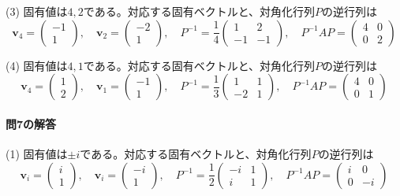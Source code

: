(3) 固有値は$4, 2$である。対応する固有ベクトルと、対角化行列$P$の逆行列は
\[
\bm{v}_4 = 
\begin{pmatrix}
-1 \\
1
\end{pmatrix}, \quad
\bm{v}_2 = 
\begin{pmatrix}
-2 \\
1
\end{pmatrix}, \quad
P^{-1} = 
\frac{1}{4}
\begin{pmatrix}
1 & 2 \\
-1 & -1
\end{pmatrix}, \quad
P^{-1} AP =
\begin{pmatrix}
4 & 0 \\
0 & 2
\end{pmatrix}
\]

(4) 固有値は$4, 1$である。対応する固有ベクトルと、対角化行列$P$の逆行列は
\[
\bm{v}_4 = 
\begin{pmatrix}
1 \\
2
\end{pmatrix}, \quad
\bm{v}_1 = 
\begin{pmatrix}
-1 \\
1
\end{pmatrix}, \quad
P^{-1} = 
\frac{1}{3}
\begin{pmatrix}
1 & 1 \\
-2 & 1
\end{pmatrix}, \quad
P^{-1} AP =
\begin{pmatrix}
4 & 0 \\
0 & 1
\end{pmatrix}
\]

\paragraph{問7の解答}

(1) 固有値は$\pm i$である。対応する固有ベクトルと、対角化行列$P$の逆行列は
\[
\bm{v}_i = 
\begin{pmatrix}
i \\
1
\end{pmatrix}, \quad
\bm{v}_i = 
\begin{pmatrix}
-i \\
1
\end{pmatrix}, \quad
P^{-1} = 
\frac{1}{2}
\begin{pmatrix}
-i & 1 \\
i & 1
\end{pmatrix}, \quad
P^{-1} AP =
\begin{pmatrix}
i & 0 \\
0 & -i
\end{pmatrix}
\]

